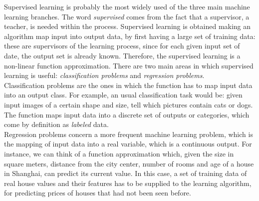 Supervised learning is probably the most widely used of the three main machine learning branches. The word \textit{supervised} comes from the fact that a supervisor, a teacher, is needed within the process. Supervised learning is obtained making an algorithm map input into output data, by first having a large set of training data: these are supervisors of the learning process, since for each given input set of date, the output set is already known. Therefore, the supervised learning is a non-linear function approximation. There are two main areas in which supervised learning is useful: \textit{classification problems} and \textit{regression problems}.
\\
\indent Classification problems are the ones in which the function has to map input data into an output class. For example, an usual classification task would be: given input images of a certain shape and size, tell which pictures contain cats or dogs. The function maps input data into a discrete set of outputs or categories, which come by definition as \textit{labeled} data.
\\
\indent Regression problems concern a more frequent machine learning problem, which is the mapping of input data into a real variable, which is a continuous output. For instance, we can think of a function approximation which, given the size in square meters, distance from the city center, number of rooms and age of a house in Shanghai, can predict its current value. In this case, a set of training data of real house values and their features has to be supplied to the learning algorithm, for predicting prices of houses that had not been seen before.


